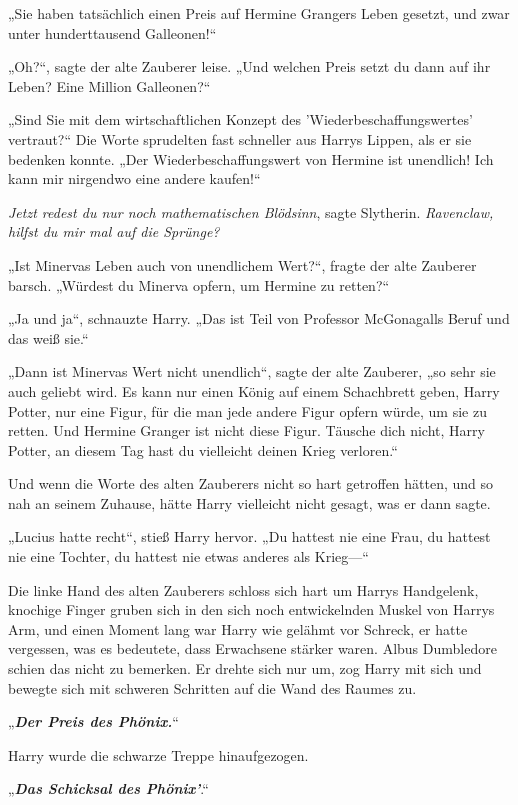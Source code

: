 {„Sie haben tatsächlich einen Preis auf Hermine Grangers Leben gesetzt, und zwar unter hunderttausend Galleonen!“

„Oh?“, sagte der alte Zauberer leise. „Und welchen Preis setzt du dann auf ihr Leben? Eine Million Galleonen?“

„Sind Sie mit dem wirtschaftlichen Konzept des 'Wiederbeschaffungswertes' vertraut?“ Die Worte sprudelten fast schneller aus Harrys Lippen, als er sie bedenken konnte. „Der Wiederbeschaffungswert von Hermine ist unendlich! Ich kann mir nirgendwo eine andere kaufen!“

\emph{Jetzt redest du nur noch mathematischen Blödsinn}, sagte Slytherin. \emph{Ravenclaw, hilfst du mir mal auf die Sprünge?}

„Ist Minervas Leben auch von unendlichem Wert?“, fragte der alte Zauberer barsch. „Würdest du Minerva opfern, um Hermine zu retten?“

„Ja und ja“, schnauzte Harry. „Das ist Teil von Professor McGonagalls Beruf und das weiß sie.“

„Dann ist Minervas Wert nicht unendlich“, sagte der alte Zauberer, „so sehr sie auch geliebt wird. Es kann nur einen König auf einem Schachbrett geben, Harry Potter, nur eine Figur, für die man jede andere Figur opfern würde, um sie zu retten. Und Hermine Granger ist nicht diese Figur. Täusche dich nicht, Harry Potter, an diesem Tag hast du vielleicht deinen Krieg verloren.“

Und wenn die Worte des alten Zauberers nicht so hart getroffen hätten, und so nah an seinem Zuhause, hätte Harry vielleicht nicht gesagt, was er dann sagte.

„Lucius hatte recht“, stieß Harry hervor. „Du hattest nie eine Frau, du hattest nie eine Tochter, du hattest nie etwas anderes als Krieg—“

Die linke Hand des alten Zauberers schloss sich hart um Harrys Handgelenk, knochige Finger gruben sich in den sich noch entwickelnden Muskel von Harrys Arm, und einen Moment lang war Harry wie gelähmt vor Schreck, er hatte vergessen, was es bedeutete, dass Erwachsene stärker waren. Albus Dumbledore schien das nicht zu bemerken. Er drehte sich nur um, zog Harry mit sich und bewegte sich mit schweren Schritten auf die Wand des Raumes zu.

„\textbf{\emph{Der Preis des Phönix.}}“

Harry wurde die schwarze Treppe hinaufgezogen.

„\textbf{\emph{Das Schicksal des Phönix'}}.“

}
